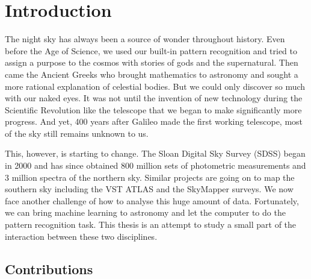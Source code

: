 
\chapter{Introduction}
\label{cha:intro}

The night sky has always been a source of wonder throughout history. Even before the Age of
Science, we used our built-in pattern recognition and tried to assign a purpose to the cosmos with
stories of gods and the supernatural. Then came the Ancient Greeks who brought mathematics to
astronomy and sought a more rational explanation of celestial bodies. But we could only discover so
much with our naked eyes. It was not until the invention of new technology during the Scientific
Revolution like the telescope that we began to make significantly more progress. And yet, 400 years
after Galileo made the first working telescope, most of the sky still remains unknown to us.

This, however, is starting to change. The Sloan Digital Sky Survey (SDSS) began in 2000 and has
since obtained 800 million sets of photometric measurements and 3 million spectra of the northern
sky. Similar projects are going on to map the southern sky including the VST ATLAS and the
SkyMapper surveys. We now face another challenge of how to analyse this huge amount of data.
Fortunately, we can bring machine learning to astronomy and let the computer to do the pattern
recognition task. This thesis is an attempt to study a small part of the interaction between these
two disciplines.

\section{Contributions}
\label{sec:contributions}

